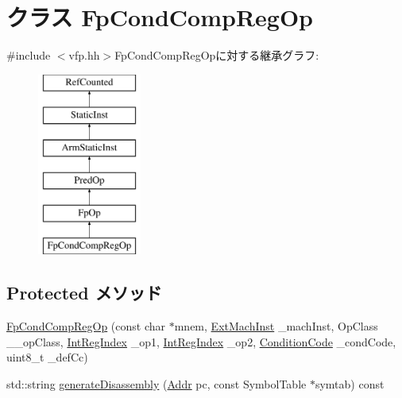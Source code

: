 \hypertarget{classArmISA_1_1FpCondCompRegOp}{
\section{クラス FpCondCompRegOp}
\label{classArmISA_1_1FpCondCompRegOp}
}


{\ttfamily \#include $<$vfp.hh$>$}FpCondCompRegOpに対する継承グラフ:\begin{figure}[H]
\begin{center}
\leavevmode
\includegraphics[height=6cm]{classArmISA_1_1FpCondCompRegOp}
\end{center}
\end{figure}
\subsection*{Protected メソッド}
\begin{DoxyCompactItemize}
\item 
\hyperlink{classArmISA_1_1FpCondCompRegOp_a635739279a75a3639f11c77721eb0a0b}{FpCondCompRegOp} (const char $\ast$mnem, \hyperlink{classStaticInst_a5605d4fc727eae9e595325c90c0ec108}{ExtMachInst} \_\-machInst, OpClass \_\-\_\-opClass, \hyperlink{namespaceArmISA_ae64680ba9fb526106829d6bf92fc791b}{IntRegIndex} \_\-op1, \hyperlink{namespaceArmISA_ae64680ba9fb526106829d6bf92fc791b}{IntRegIndex} \_\-op2, \hyperlink{namespaceArmISA_ab8f08e777c4753720cff841f81da8e06}{ConditionCode} \_\-condCode, uint8\_\-t \_\-defCc)
\item 
std::string \hyperlink{classArmISA_1_1FpCondCompRegOp_a95d323a22a5f07e14d6b4c9385a91896}{generateDisassembly} (\hyperlink{classm5_1_1params_1_1Addr}{Addr} pc, const SymbolTable $\ast$symtab) const 
\end{DoxyCompactItemize}
